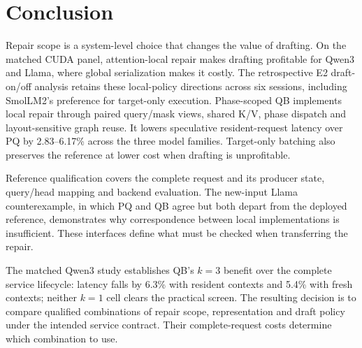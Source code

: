 \section{Conclusion}
Repair scope is a system-level choice that changes the value of drafting. On the matched CUDA panel, attention-local repair makes drafting profitable for Qwen3 and Llama, where global serialization makes it costly. The retrospective E2 draft-on/off analysis retains these local-policy directions across six sessions, including SmolLM2's preference for target-only execution. Phase-scoped QB implements local repair through paired query/mask views, shared K/V, phase dispatch and layout-sensitive graph reuse. It lowers speculative resident-request latency over PQ by 2.83--6.17\% across the three model families. Target-only batching also preserves the reference at lower cost when drafting is unprofitable.

Reference qualification covers the complete request and its producer state, query/head mapping and backend evaluation. The new-input Llama counterexample, in which PQ and QB agree but both depart from the deployed reference, demonstrates why correspondence between local implementations is insufficient. These interfaces define what must be checked when transferring the repair.

The matched Qwen3 study establishes QB's $k=3$ benefit over the complete service lifecycle: latency falls by 6.3\% with resident contexts and 5.4\% with fresh contexts; neither $k=1$ cell clears the practical screen. The resulting decision is to compare qualified combinations of repair scope, representation and draft policy under the intended service contract. Their complete-request costs determine which combination to use.
